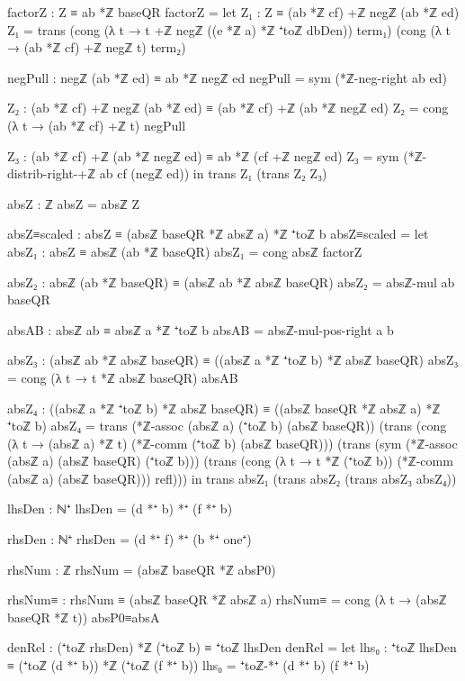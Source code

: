 \documentclass[11pt,a4paper]{book}
\begin{document}
\begin{code}
    factorZ : Z ≡ ab *ℤ baseQR
    factorZ =
      let
        Z₁ : Z ≡ (ab *ℤ cf) +ℤ negℤ (ab *ℤ ed)
        Z₁ =
          trans
            (cong (λ t → t +ℤ negℤ ((e *ℤ a) *ℤ ⁺toℤ dbDen)) term₁)
            (cong (λ t → (ab *ℤ cf) +ℤ negℤ t) term₂)

        negPull : negℤ (ab *ℤ ed) ≡ ab *ℤ negℤ ed
        negPull = sym (*ℤ-neg-right ab ed)

        Z₂ : (ab *ℤ cf) +ℤ negℤ (ab *ℤ ed) ≡ (ab *ℤ cf) +ℤ (ab *ℤ negℤ ed)
        Z₂ = cong (λ t → (ab *ℤ cf) +ℤ t) negPull

        Z₃ : (ab *ℤ cf) +ℤ (ab *ℤ negℤ ed) ≡ ab *ℤ (cf +ℤ negℤ ed)
        Z₃ = sym (*ℤ-distrib-right-+ℤ ab cf (negℤ ed))
      in
      trans Z₁ (trans Z₂ Z₃)

    absZ : ℤ
    absZ = absℤ Z

    absZ≡scaled : absZ ≡ (absℤ baseQR *ℤ absℤ a) *ℤ ⁺toℤ b
    absZ≡scaled =
      let
        absZ₁ : absZ ≡ absℤ (ab *ℤ baseQR)
        absZ₁ = cong absℤ factorZ

        absZ₂ : absℤ (ab *ℤ baseQR) ≡ (absℤ ab *ℤ absℤ baseQR)
        absZ₂ = absℤ-mul ab baseQR

        absAB : absℤ ab ≡ absℤ a *ℤ ⁺toℤ b
        absAB = absℤ-mul-pos-right a b

        absZ₃ : (absℤ ab *ℤ absℤ baseQR) ≡ ((absℤ a *ℤ ⁺toℤ b) *ℤ absℤ baseQR)
        absZ₃ = cong (λ t → t *ℤ absℤ baseQR) absAB

        absZ₄ : ((absℤ a *ℤ ⁺toℤ b) *ℤ absℤ baseQR) ≡ ((absℤ baseQR *ℤ absℤ a) *ℤ ⁺toℤ b)
        absZ₄ =
          trans
            (*ℤ-assoc (absℤ a) (⁺toℤ b) (absℤ baseQR))
            (trans
              (cong (λ t → (absℤ a) *ℤ t) (*ℤ-comm (⁺toℤ b) (absℤ baseQR)))
              (trans
                (sym (*ℤ-assoc (absℤ a) (absℤ baseQR) (⁺toℤ b)))
                (trans
                  (cong (λ t → t *ℤ (⁺toℤ b)) (*ℤ-comm (absℤ a) (absℤ baseQR)))
                  refl)))
      in
      trans absZ₁ (trans absZ₂ (trans absZ₃ absZ₄))

    lhsDen : ℕ⁺
    lhsDen = (d *⁺ b) *⁺ (f *⁺ b)

    rhsDen : ℕ⁺
    rhsDen = (d *⁺ f) *⁺ (b *⁺ one⁺)

    rhsNum : ℤ
    rhsNum = (absℤ baseQR *ℤ absP0)

    rhsNum≡ : rhsNum ≡ (absℤ baseQR *ℤ absℤ a)
    rhsNum≡ = cong (λ t → (absℤ baseQR *ℤ t)) absP0≡absA

    denRel : (⁺toℤ rhsDen) *ℤ (⁺toℤ b) ≡ ⁺toℤ lhsDen
    denRel =
      let
        lhs₀ : ⁺toℤ lhsDen ≡ (⁺toℤ (d *⁺ b)) *ℤ (⁺toℤ (f *⁺ b))
        lhs₀ = ⁺toℤ-*⁺ (d *⁺ b) (f *⁺ b)


\end{code}
\end{document}
